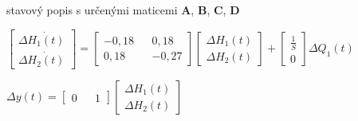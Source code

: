 \documentclass{article}
\begin{document}
\begin{center}
			stavový popis s určenými maticemi \textbf{A}, \textbf{B}, \textbf{C}, \textbf{D}
			
			\bigskip
			
			$\begin{bmatrix}
			\Delta \dot{H_1(t)}\\
			\Delta \dot{H_2(t)}
			\end{bmatrix}=\begin{bmatrix}
			-0,18 && 0,18\\
			0,18&& -0,27
			\end{bmatrix}\begin{bmatrix}
			\Delta H_1(t)\\
			\Delta H_2(t)
			\end{bmatrix}+\begin{bmatrix}
			\frac{1}{S}\\
			0
			\end{bmatrix}\Delta Q_1(t)$
			
			\bigskip
			
			$\Delta y(t)=\begin{bmatrix}
			0 && 1
			\end{bmatrix}\begin{bmatrix}
			\Delta H_1(t)\\
			\Delta H_2(t)
			\end{bmatrix}$
			\end{center} 
		\newpage
\end{document}
